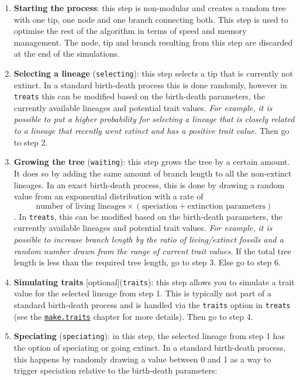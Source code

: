 \documentclass[
]{book}
\providecommand{\tightlist}{%
  \setlength{\itemsep}{0pt}\setlength{\parskip}{0pt}}
\begin{document}
\begin{enumerate}
\def\labelenumi{\arabic{enumi}.}
\setcounter{enumi}{-1}
\tightlist
\item
  \textbf{Starting the process}: this step is non-modular and creates a random tree with one tip, one node and one branch connecting both. This step is used to optimise the rest of the algorithm in terms of speed and memory management. The node, tip and branch resulting from this step are discarded at the end of the simulations.
\item
  \textbf{Selecting a lineage} (\texttt{selecting}): this step selects a tip that is currently not extinct. In a standard birth-death process this is done randomly, however in \texttt{treats} this can be modified based on the birth-death parameters, the currently available lineages and potential trait values. \emph{For example, it is possible to put a higher probability for selecting a lineage that is closely related to a lineage that recently went extinct and has a positive trait value.}
  Then go to step 2.
\item
  \textbf{Growing the tree} (\texttt{waiting}): this step grows the tree by a certain amount. It does so by adding the same amount of branch length to all the non-extinct lineages. In an exact birth-death process, this is done by drawing a random value from an exponential distribution with a rate of \[\text{number of living lineages} \times (\text{speciation} + \text{extinction parameters})\]. In \texttt{treats}, this can be modified based on the birth-death parameters, the currently available lineages and potential trait values. \emph{For example, it is possible to increase branch length by the ratio of living/extinct fossils and a random number drawn from the range of current trait values.}
  If the total tree length is less than the required tree length, go to step 3. Else go to step 6.
\item
  \textbf{Simulating traits} {[}optional{]}(\texttt{traits}): this step allows you to simulate a trait value for the selected lineage from step 1. This is typically not part of a standard birth-death process and is handled via the \texttt{traits} option in \texttt{treats} (see the \protect\hyperlink{maketraits}{\texttt{make.traits}} chapter for more details).
  Then go to step 4.
\item
  \textbf{Speciating} (\texttt{speciating}): in this step, the selected lineage from step 1 has the option of speciating or going extinct. In a standard birth-death process, this happens by randomly drawing a value between 0 and 1 as a way to trigger speciation relative to the birth-death parameters:
\end{enumerate}
\end{document}
